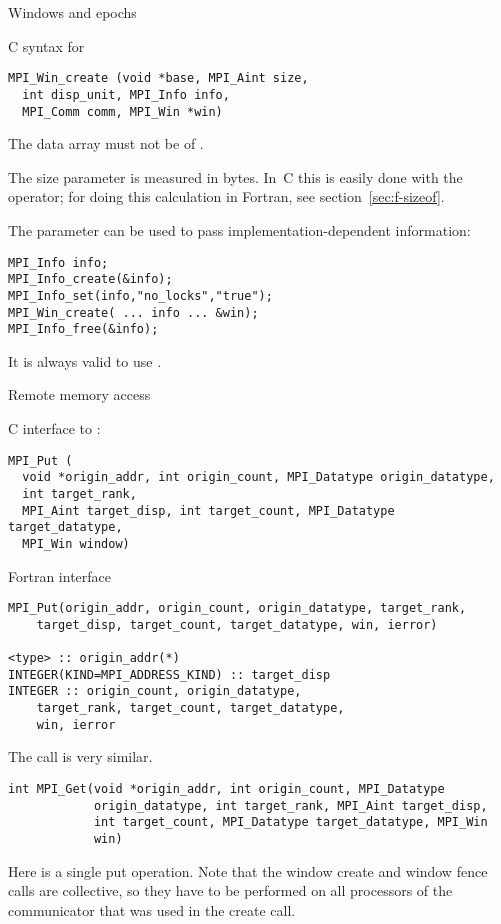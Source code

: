  {Windows and epochs}

C syntax for 
\begin{verbatim}
MPI_Win_create (void *base, MPI_Aint size, 
  int disp_unit, MPI_Info info, 
  MPI_Comm comm, MPI_Win *win)
\end{verbatim}
The data array must not be  of .

The size parameter is measured in bytes. In~C this is easily done
with the  operator;
for doing this calculation in Fortran, see section~\ref{sec:f-sizeof}.

The  parameter can be used to pass implementation-dependent 
information:
\begin{verbatim}
MPI_Info info;
MPI_Info_create(&info);
MPI_Info_set(info,"no_locks","true");
MPI_Win_create( ... info ... &win);
MPI_Info_free(&info);
\end{verbatim}
It is always valid to use .

 {Remote memory access}

C interface to :
\begin{verbatim}
MPI_Put (
  void *origin_addr, int origin_count, MPI_Datatype origin_datatype,
  int target_rank,
  MPI_Aint target_disp, int target_count, MPI_Datatype target_datatype,
  MPI_Win window)
\end{verbatim}
Fortran interface
\begin{verbatim}
MPI_Put(origin_addr, origin_count, origin_datatype, target_rank,
    target_disp, target_count, target_datatype, win, ierror)

<type> :: origin_addr(*)
INTEGER(KIND=MPI_ADDRESS_KIND) :: target_disp
INTEGER :: origin_count, origin_datatype,
    target_rank, target_count, target_datatype,
    win, ierror
\end{verbatim}


The  call is very similar.
\begin{verbatim}
int MPI_Get(void *origin_addr, int origin_count, MPI_Datatype
            origin_datatype, int target_rank, MPI_Aint target_disp,
            int target_count, MPI_Datatype target_datatype, MPI_Win
            win)
\end{verbatim}

Here is a single put operation. Note that the window create and window fence calls
are collective, so they have to be performed on all processors
of the communicator that was used in the create call.

